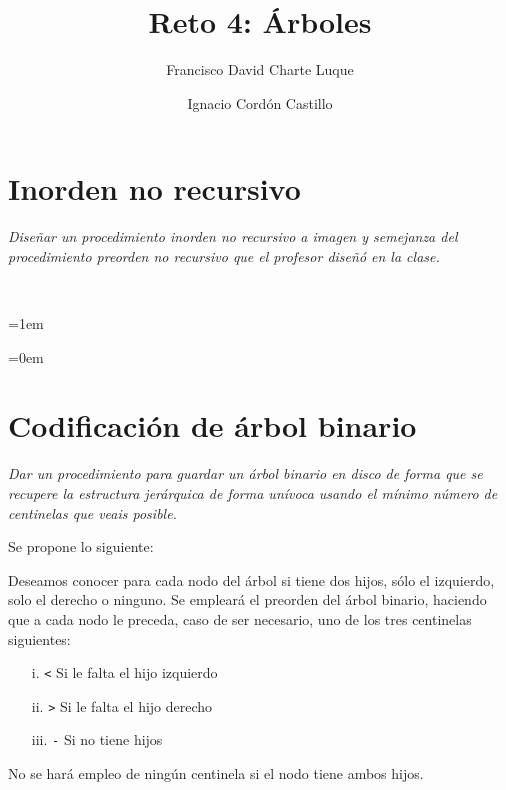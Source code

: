 \documentclass[a4paper,10pt]{scrartcl}
\title{Reto 4: Árboles}
\author{Francisco David Charte Luque\and
        Ignacio Cordón Castillo}
\date{}
\begin{document}
\maketitle
\section{Inorden no recursivo}
        \textit{Diseñar un procedimiento inorden no recursivo a imagen y semejanza
        del procedimiento preorden no recursivo que el profesor diseñó en la clase.}

 \ 
 
 \leftskip=1em
 \small
 \texttt{}
 \normalsize
 
 \leftskip=0em
 \section{Codificación de árbol binario}
         \textit{Dar un procedimiento para guardar un árbol binario en disco de forma que se
         recupere la estructura jerárquica de forma unívoca usando el mínimo número
         de centinelas que veais posible.}
         
  Se propone lo siguiente:
 
 Deseamos conocer para cada nodo del árbol si tiene dos hijos, sólo el
 izquierdo, solo el derecho o ninguno. Se empleará el preorden del árbol
 binario, haciendo que a cada nodo le preceda, caso de ser necesario, uno
 de los tres centinelas siguientes:
  
 \begin{enumerate}
 \item[i.] \texttt{<} Si le falta el hijo izquierdo
 \item[ii.] \texttt{>} Si le falta el hijo derecho
 \item[iii.] \texttt{-} Si no tiene hijos
 \end{enumerate}
 
 No se hará empleo de ningún centinela si el nodo tiene ambos hijos.
\end{document}
